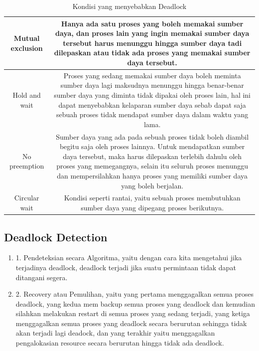 \begin{table}[h]
\caption{Kondisi yang menyebabkan Deadlock}
\begin{tabular}{|c|c|}
\hline
Mutual exclusion&Hanya ada satu proses yang boleh memakai sumber daya, dan proses lain yang ingin memakai sumber daya tersebut harus menunggu hingga sumber daya tadi dilepaskan atau tidak ada proses yang memakai sumber daya tersebut.\\
\hline
Hold and wait&Proses yang sedang memakai sumber daya boleh meminta sumber daya lagi maksudnya menunggu hingga benar-benar sumber daya yang diminta tidak dipakai oleh proses lain, hal ini dapat menyebabkan kelaparan sumber daya sebab dapat saja sebuah proses tidak mendapat sumber daya dalam waktu yang lama.\\
\hline
No preemption&Sumber daya yang ada pada sebuah proses tidak boleh diambil begitu saja oleh proses lainnya. Untuk mendapatkan sumber daya tersebut, maka harus dilepaskan terlebih dahulu oleh proses yang memegangnya, selain itu seluruh proses menunggu dan mempersilahkan hanya proses yang memiliki sumber daya yang boleh berjalan. \\
\hline
Circular wait&Kondisi seperti rantai, yaitu sebuah proses membutuhkan sumber daya yang dipegang proses berikutnya.\\
\hline
\end{tabular}
\label{deadlock}
\end{table}

\subsection {Deadlock Detection}
\begin {enumerate}
\item
1. Pendeteksian secara Algoritma, yaitu dengan cara kita mengetahui jika terjadinya deadlock, deadlock terjadi jika suatu permintaan tidak dapat ditangani segera.
	
\item
2. Recovery atau Pemulihan, yaitu yang pertama menggagalkan semua proses deadlock, yang kedua mem backup semua proses yang deadlock dan kemudian silahkan melakukan restart di semua proses yang sedang terjadi, yang ketiga menggagalkan semua proses yang deadlock secara berurutan sehingga tidak akan terjadi lagi deadock, dan yang terakhir yaitu menggagalkan pengalokasian resource secara berurutan hingga tidak ada deadlock.

\end {enumerate}

